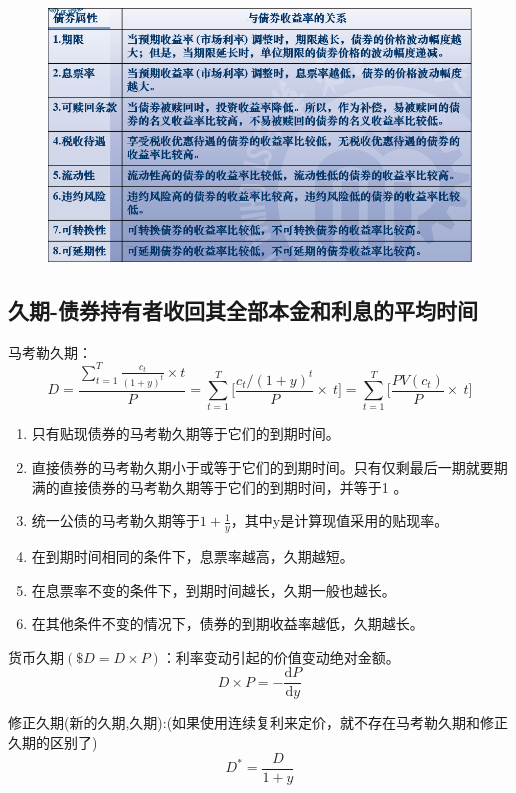 \documentclass{article}
\begin{document}
\begin{figure}[H]
    \begin{center}
        \includegraphics[width=1\textwidth]{2.png}
    \end{center}
\end{figure}
\clearpage

\subsection*{久期-债券持有者收回其全部本金和利息的平均时间}
马考勒久期：
\[D=\frac{\sum_{t=1}^{T}{\frac{c_t}{\left(1+y\right)^t}\times t}}{P}=\sum_{t=1}^{T}{[\frac{c_t/\left(1+y\right)^t}{P}}\times\ t]=\sum_{t=1}^{T}{[\frac{PV\left(c_t\right)}{P}}\times\ t]\]
\begin{enumerate}
    \item 只有贴现债券的马考勒久期等于它们的到期时间。
    \item 直接债券的马考勒久期小于或等于它们的到期时间。只有仅剩最后一期就要期满的直接债券的马考勒久期等于它们的到期时间，并等于1 。
    \item 统一公债的马考勒久期等于$1+\frac{1}{y}$，其中y是计算现值采用的贴现率。
    \item 在到期时间相同的条件下，息票率越高，久期越短。
    \item 在息票率不变的条件下，到期时间越长，久期一般也越长。
    \item 在其他条件不变的情况下，债券的到期收益率越低，久期越长。
\end{enumerate}

货币久期$(\$D=D\times P)$：利率变动引起的价值变动绝对金额。
\[D\times P=-\frac{\text{d}P}{\text{d}y}\]

修正久期(新的久期,久期):(如果使用连续复利来定价，就不存在马考勒久期和修正久期的区别了)
\[D^\ast=\frac{D}{1+y}\]
\end{document}

